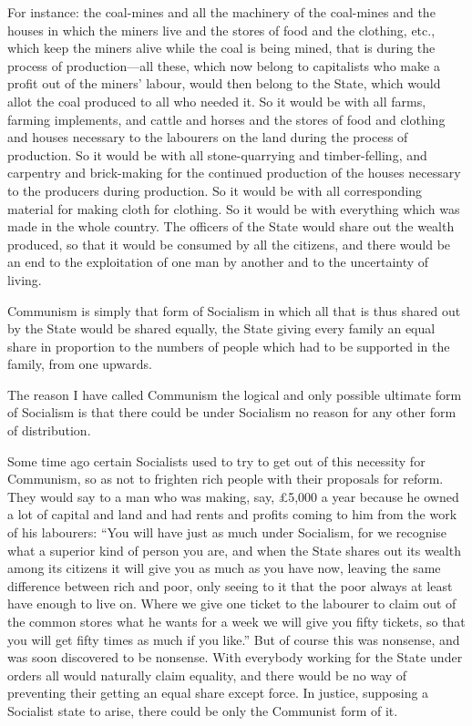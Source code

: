 \documentclass{book}
\begin{document}
For instance: the coal-mines and all the machinery of the coal-mines and the houses in which the miners live and the stores of food and the clothing, etc., which keep the miners alive while the coal is being mined, that is during the process of production—all these, which now belong to capitalists who make a profit out of the miners’ labour, would then belong to the State, which would allot the coal produced to all who needed it. So it would be with all farms, farming implements, and cattle and horses and the stores of food and clothing and houses necessary to the labourers on the land during the process of production. So it would be with all stone-quarrying and timber-felling, and carpentry and brick-making for the continued production of the houses necessary to the producers during production. So it would be with all corresponding material for making cloth for clothing. So it would be with everything which was made in the whole country. The officers of the State would share out the wealth produced, so that it would be consumed by all the citizens, and there would be an end to the exploitation of one man by another and to the uncertainty of living.

Communism is simply that form of Socialism in which all that is thus shared out by the State would be shared equally, the State giving every family an equal share in proportion to the numbers of people which had to be supported in the family, from one upwards.

The reason I have called Communism the logical and only possible ultimate form of Socialism is that there could be under Socialism no reason for any other form of distribution.

Some time ago certain Socialists used to try to get out of this necessity for Communism, so as not to frighten rich people with their proposals for reform. They would say to a man who was making, say, £5,000 a year because he owned a lot of capital and land and had rents and profits coming to him from the work of his labourers: “You will have just as much under Socialism, for we recognise what a superior kind of person you are, and when the State shares out its wealth among its citizens it will give you as much as you have now, leaving the same difference between rich and poor, only seeing to it that the poor always at least have enough to live on. Where we give one ticket to the labourer to claim out of the common stores what he wants for a week we will give you fifty tickets, so that you will get fifty times as much if you like.” But of course this was nonsense, and was soon discovered to be nonsense. With everybody working for the State under orders all would naturally claim equality, and there would be no way of preventing their getting an equal share except force. In justice, supposing a Socialist state to arise, there could be only the Communist form of it.
\end{document}
